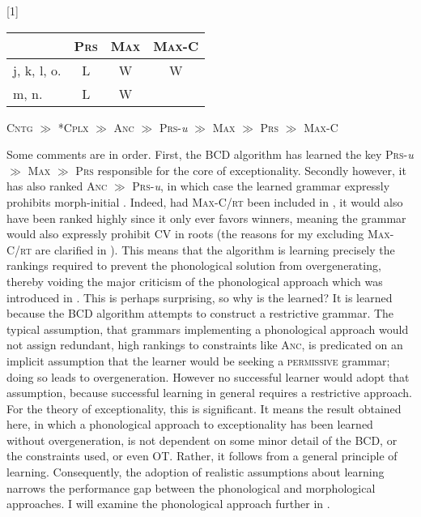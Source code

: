 \documentclass[output=paper,
modfonts
]{LSP/langsci}
\begin{document}
\ea \label{ex:round:33} 
\renewcommand*\arraystretch{1.2}
\scalebox{1}[1]{\begin{tabular}[t]{|l||c||c|c|}
\firsthline & \textsc{Prs} & \textsc{Max} & \textsc{Max-C} \\
\hline
\hline j, k, l, o. & L & W & W \\
\hline m, n. & L & W & \\
\hline \end{tabular}} \renewcommand*\arraystretch{1}
\z

\ea \label{ex:round:34}
\textsc{Cntg} \textsc{${\gg}$}\textsc{} \textsc{*Cplx} \textsc{${\gg}$} \textsc{Anc} \textsc{${\gg}$}\textsc{} \textsc{Prs}{}-\textit{u} ${\gg}$ \textsc{Max} \textsc{${\gg}$}\textsc{} \textsc{Prs} \textsc{${\gg}$} \textsc{Max-C}
\z

Some comments are in order. First, the BCD algorithm has learned the key   \textsc{Prs}{}-\textit{u} ${\gg}$ \textsc{Max} \textsc{${\gg}$}\textsc{} \textsc{Prs} responsible for the core of  exceptionality. Secondly however, it has also ranked \textsc{Anc} \textsc{${\gg}$} \textsc{Prs}{}-\textit{u}, in which case the learned grammar expressly prohibits morph-initial . Indeed, had \textsc{Max-C/rt} been included in , it would also have been ranked highly since it only ever favors winners, meaning the grammar would also expressly prohibit CV  in roots (the reasons for my excluding \textsc{Max-C/rt} are clarified in ). This means that the algorithm is learning precisely the rankings required to prevent the phonological solution from overgenerating, thereby voiding the major criticism of the phonological approach which was introduced in . This is perhaps surprising, so why is the  learned? It is learned because the BCD algorithm attempts to construct a restrictive grammar. The typical assumption, that grammars implementing a phonological approach would not assign redundant, high rankings to constraints like \textsc{Anc}, is predicated on an implicit assumption that the learner would be seeking a \textsc{permissive} grammar; doing so leads to overgeneration. However no successful learner would adopt that assumption, because successful learning in general requires a restrictive approach. For the theory of exceptionality, this is significant. It means the result obtained here, in which a phonological approach to exceptionality has been learned without overgeneration, is not dependent on some minor detail of the BCD, or the constraints used, or even OT. Rather, it follows from a general principle of learning. Consequently, the adoption of realistic assumptions about learning narrows the performance gap between the phonological and morphological approaches. I will examine the phonological approach further in .
\end{document}
